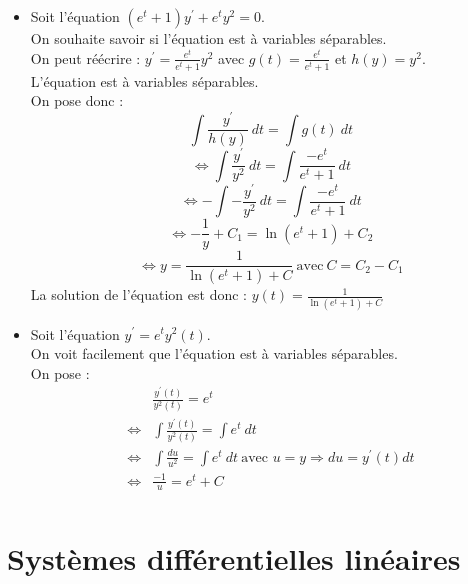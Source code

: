 \begin{ex}
\begin{itemize}
    \item Soit l'équation $(e^t+1)y^{\prime}+e^ty^2=0$.\\
    On souhaite savoir si l'équation est à variables séparables.\\
    On peut réécrire : $y^{\prime}=\frac{e^t}{e^t+1}y^2$ avec $g(t)=\frac{e^t}{e^t+1}$ et $h(y)=y^2$.\\
    L'équation est à variables séparables.\\
    On pose donc :\\
    $$\int\frac{y^{\prime}}{h(y)}\ dt=\int g(t)\ dt$$
    $$\Leftrightarrow\int\frac{y^{\prime}}{y^2}\ dt=\int \frac{-e^t}{e^t+1}\ dt$$
    $$\Leftrightarrow-\int -\frac{y^{\prime}}{y^2}\ dt=\int \frac{-e^t}{e^t+1}\ dt$$
    $$\Leftrightarrow-\frac{1}{y}+C_1= \ln(e^t+1) +C_2$$
    $$\Leftrightarrow y=\frac{1}{\ln(e^t+1)+C}\ \text{avec}\ C=C_2-C_1$$
    La solution de l'équation est donc : $y(t)=\frac{1}{\ln(e^t+1)+C}$
    \item Soit l'équation $y^{\prime}=e^ty^2(t)$.\\
    On voit facilement que l'équation est à variables séparables.\\
    On pose :
    \begin{align*}
        & \frac{y^{\prime}(t)}{y^2(t)}=e^t\\
        \Leftrightarrow & \int\frac{y^{\prime}(t)}{y^2(t)}=\int e^t\ dt\\
        \Leftrightarrow & \int\frac{du}{u^2}=\int e^t\ dt\ \text{avec } u=y\Rightarrow du=y^{\prime}(t)dt\\
        \Leftrightarrow & \frac{-1}{u}=e^t+C\\
    \end{align*}
\end{itemize}
\end{ex}
\section{Systèmes différentielles linéaires}
